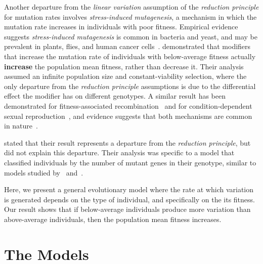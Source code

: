 \documentclass[9pt, a4paper, twocolumn]{extarticle}
\begin{document}
Another departure from the \emph{linear variation} assumption of the \emph{reduction principle} for mutation rates involves \emph{stress-induced mutagenesis}, a mechanism in which the mutation rate increases in individuals with poor fitness.
Empirical evidence suggests \emph{stress-induced mutagenesis} is common in bacteria and yeast, and may be prevalent in plants, flies, and human cancer cells~\citep{Rosenberg2012,Fitzgerald2017b}.
\citet{Ram2012} demonstrated that modifiers that increase the mutation rate of individuals with below-average fitness actually \textbf{increase} the population mean fitness, rather than decrease it.
Their analysis assumed an infinite population size and constant-viability selection, where the only departure from the \emph{reduction principle} assumptions is due to the differential effect the modifier has on different genotypes.
A similar result has been demonstrated for fitness-associated recombination~\citep{Hadany2003a} and for condition-dependent sexual reproduction~\citep{Hadany2007a}, and evidence suggests that both mechanisms are common in nature~\citep{Ram2016}.

\citet{Ram2012} stated that their result represents a departure from the \emph{reduction principle}, but did not explain this departure.
Their analysis was specific to a model that classified individuals by the number of mutant genes in their genotype, similar to models studied by~\citet{Kimura1966a} and~\citet{Haigh1978}.

Here, we present a general evolutionary model where the rate at which variation is generated depends on the type of individual, and specifically on the its fitness.
Our result shows that if below-average individuals produce more variation than above-average individuals, then the population mean fitness increases.

\section*{The Models}
\end{document}
